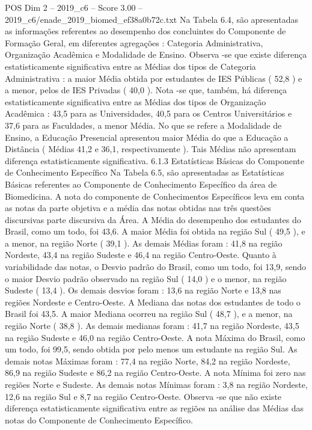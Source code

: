 \begin{textsample}{POS Dim 2 – 2019\_c6 – Score 3.00 – 2019\_c6/enade\_2019\_biomed\_ef38a0b72c.txt}
Na Tabela 6.4, são apresentadas as informações referentes ao desempenho dos concluintes do Componente de Formação Geral, em diferentes agregações : Categoria Administrativa, Organização Acadêmica e Modalidade de Ensino.
Observa -se que existe diferença estatisticamente significativa entre as Médias dos tipos de Categoria Administrativa : a maior Média obtida por estudantes de IES Públicas ( 52,8 ) e a menor, pelos de IES Privadas ( 40,0 ).
Nota -se que, também, há diferença estatisticamente significativa entre as Médias dos tipos de Organização Acadêmica : 43,5 para as Universidades, 40,5 para os Centros Universitários e 37,6 para as Faculdades, a menor Média.
No que se refere a Modalidade de Ensino, a Educação Presencial apresentou maior Média do que a Educação a Distância ( Médias 41,2 e 36,1, respectivamente ).
Tais Médias não apresentam diferença estatisticamente significativa. 6.1.3 Estatísticas Básicas do Componente de Conhecimento Específico Na Tabela 6.5, são apresentadas as Estatísticas Básicas referentes ao Componente de Conhecimento Específico da área de Biomedicina.
A nota do componente de Conhecimentos Específicos leva em conta as notas da parte objetiva e a média das notas obtidas nas três questões discursivas parte discursiva da Área.
A Média do desempenho dos estudantes do Brasil, como um todo, foi 43,6.
A maior Média foi obtida na região Sul ( 49,5 ), e a menor, na região Norte ( 39,1 ).
As demais Médias foram : 41,8 na região Nordeste, 43,4 na região Sudeste e 46,4 na região Centro-Oeste.
Quanto à variabilidade das notas, o Desvio padrão do Brasil, como um todo, foi 13,9, sendo o maior Desvio padrão observado na região Sul ( 14,0 ) e o menor, na região Sudeste ( 13,4 ).
Os demais desvios foram : 13,6 na região Norte e 13,8 nas regiões Nordeste e Centro-Oeste.
A Mediana das notas dos estudantes de todo o Brasil foi 43,5.
A maior Mediana ocorreu na região Sul ( 48,7 ), e a menor, na região Norte ( 38,8 ).
As demais medianas foram : 41,7 na região Nordeste, 43,5 na região Sudeste e 46,0 na região Centro-Oeste.
A nota Máxima do Brasil, como um todo, foi 99,5, sendo obtida por pelo menos um estudante na região Sul.
As demais notas Máximas foram : 77,4 na região Norte, 84,2 na região Nordeste, 86,9 na região Sudeste e 86,2 na região Centro-Oeste.
A nota Mínima foi zero nas regiões Norte e Sudeste.
As demais notas Mínimas foram : 3,8 na região Nordeste, 12,6 na região Sul e 8,7 na região Centro-Oeste.
Observa -se que não existe diferença estatisticamente significativa entre as regiões na análise das Médias das notas do Componente de Conhecimento Específico.

\end{textsample}
